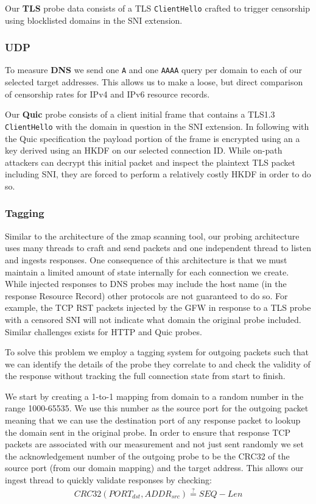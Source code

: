 Our \textbf{TLS} probe data consists of a TLS \texttt{ClientHello} crafted to
trigger censorship using blocklisted domains in the SNI extension.

\subsubsection{UDP}
To measure \textbf{DNS} we send one {\tt A} and one {\tt AAAA} query per domain
to each of our selected target addresses. This allows us to make a loose, but
direct comparison of censorship rates for IPv4 and IPv6 resource records.


Our \textbf{Quic} probe consists of a client initial frame that contains a
TLS1.3 {\tt ClientHello} with the domain in question in the SNI extension. In
following with the Quic specification the payload portion of the frame is
encrypted using an a key derived using an HKDF on our selected connection ID.
While on-path attackers can decrypt this initial packet and inspect the
plaintext TLS packet including SNI, they are forced to perform a relatively
costly HKDF in order to do so.

\subsubsection{Tagging}

Similar to the architecture of the zmap scanning tool, our probing architecture
uses many threads to craft and send packets and one independent thread to listen
and ingests responses. One consequence of this architecture is that we must
maintain a limited amount of state internally for each connection we create.
While injected responses to DNS probes may include the host name (in the
response Resource Record) other protocols are not guaranteed to do so. For
example, the TCP RST packets injected by the GFW in response to a TLS probe with
a censored SNI will not indicate what domain the original probe included.
Similar challenges exists for HTTP and Quic probes.

To solve this problem we employ a tagging system for outgoing packets such that
we can identify the details of the probe they correlate to and check the
validity of the response without tracking the full connection state from start
to finish.

We start by creating a 1-to-1 mapping from domain to a random number in the
range 1000-65535. We use this number as the source port for the outgoing packet
meaning that we can use the destination port of any response packet to lookup
the domain sent in the original probe. In order to ensure that response TCP
packets are associated with our measurement and not just sent randomly we set
the acknowledgement number of the outgoing probe to be the CRC32 of the source
port (from our domain mapping) and the target address. This allows our ingest
thread to quickly validate responses by checking:
\begin{gather*}
CRC32(PORT_{dst},ADDR_{src}) \stackrel{?}{=} SEQ - Len
\end{gather*}

